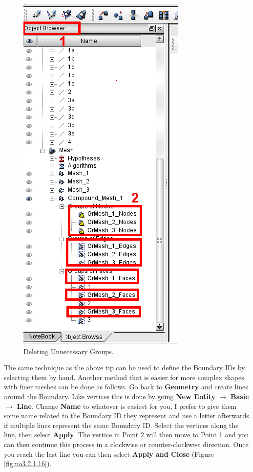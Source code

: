 \begin{figure}[h!]
\begin{center}
\includegraphics[scale=0.50]{figures/SalomeStep5b.png}
\caption{Deleting Unnecessary Groups.}
\label{fig:no3.2.1.15}
\end{center}
\end{figure}
          
The same technique as the above tip can be used to define the Boundary IDs by selecting them by hand. Another method that is easier for more complex shapes with finer meshes can be done as follows. Go back to \textbf{Geometry} and create lines around the Boundary. Like vertices this is done by going \textbf{New Entity} $\rightarrow$ \textbf{Basic} $\rightarrow$ \textbf{Line}. Change \textbf{Name} to whatever is easiest for you, I prefer to give them some name related to the Boundary ID they represent and use a letter afterwards if multiple lines represent the same Boundary ID. Select the vertices along the line, then select \textbf{Apply}. The vertice in Point 2 will then move to Point 1 and you can then continue this process in a clockwise or counter-clockwise direction. Once you reach the last line you can then select \textbf{Apply and Close} (Figure \ref{fig:no3.2.1.16}).
  
